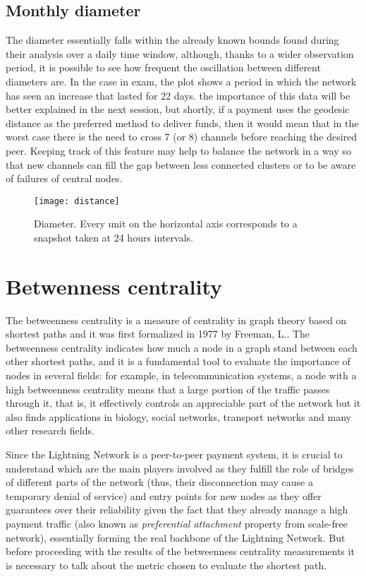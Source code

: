 	\subsection{Monthly diameter}
	
	The diameter essentially falls within the already known bounds found during their analysis over a daily time window, although, thanks to a wider observation period, it is possible to see how frequent the oscillation between different diameters are. In the case in exam, the plot shows a period in which the network has seen an increase that lasted for 22 days. the importance of this data will be better explained in the next session, but shortly, if a payment uses the geodesic distance as the preferred method to deliver funds, then it would mean that in the worst case there is the need to cross 7 (or 8) channels before reaching the desired peer. Keeping track of this feature may help to balance the network in a way so that new channels can fill the gap between less connected clusters or to be aware of failures of central nodes.
	
	\begin{figure}
		\centering
		\texttt{[image: distance]}
		\caption{Diameter. Every unit on the horizontal axis corresponds to a snapshot taken at 24 hours intervals.}
		\label{monthly_diameter}
	\end{figure}

	\section{Betwenness	centrality}
	\label{sec:betweenness}
	
	The betweenness centrality is a measure of centrality in graph theory based on shortest paths and it was first formalized in 1977 by Freeman, L.\cite{Freeman1977}. The betweenness centrality indicates how much a node in a graph stand between each other shortest paths, and it is a fundamental tool to evaluate the importance of nodes in several fields: for example, in telecommunication systems, a node with a high betweenness centrality means that a large portion of the traffic passes through it, that is, it effectively controls an appreciable part of the network but it also finds applications in biology, social networks, transport networks and many other research fields. 
	
	Since the Lightning Network is a peer-to-peer payment system, it is crucial to understand which are the main players involved as they fulfill the role of bridges of different parts of the network (thus, their disconnection may cause a temporary denial of service) and entry points for new nodes as they offer guarantees over their reliability given the fact that they already manage a high payment traffic (also known as \textit{preferential attachment} property from scale-free network), essentially forming the real backbone of the Lightning Network. But before proceeding with the results of the betweenness centrality measurements it is necessary to talk about the metric chosen to evaluate the shortest path.
	
